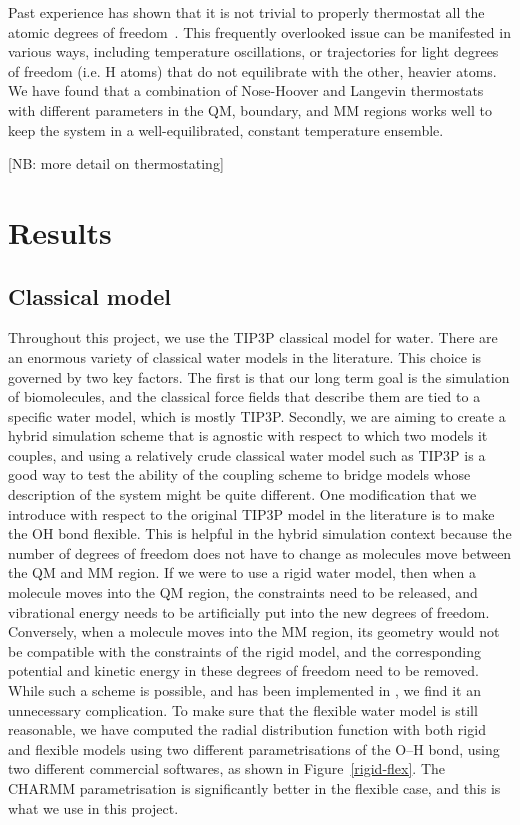 \documentclass[11pt]{revtex4}
\begin{document}
Past experience has shown that it is not trivial to properly
thermostat all the atomic degrees of freedom~\cite{winfield_thesis_2009a}.
This frequently overlooked issue can be manifested in various ways,
including temperature oscillations, or trajectories for light degrees
of freedom (i.e. H atoms) that do not equilibrate with the other,
heavier atoms.  We have found that a combination of Nose-Hoover and
Langevin thermostats with different parameters in the QM, boundary,
and MM regions works well to keep the system in a well-equilibrated,
constant temperature ensemble.

[NB: more detail on thermostating]

\section{Results}

\subsection{Classical model}

Throughout this project, we use the TIP3P classical model for water. There are an enormous variety of classical water models in the literature. This choice is governed by two key factors. The first is that our long term goal is the simulation of biomolecules, and the classical force fields that describe them are tied to a specific water model, which is mostly TIP3P. Secondly, we are aiming to create a hybrid simulation scheme that is agnostic with respect to which two models it couples, and using a relatively crude classical water model such as TIP3P is a good way to test the ability of the coupling scheme to bridge models whose description of the system might be quite different. One modification that we introduce with respect to the original TIP3P model in the literature is to make the OH bond flexible. This is helpful in the hybrid simulation context because the number of degrees of freedom does not have to change as molecules move between the QM and MM region. If we were to use a rigid water model, then when a molecule moves into the QM region, the constraints need to be released, and vibrational energy needs to be artificially put into the new degrees of freedom. Conversely, when a molecule moves into the MM region, its geometry would not be compatible with the constraints of the rigid model, and the corresponding potential and kinetic energy in these degrees of freedom need to be removed. While such a scheme is possible, and has been implemented in \cite{winfield_thesis_2009a}, we find it an unnecessary complication. To make sure that the flexible water model is still reasonable, we have computed the radial distribution function with both rigid and flexible models using two different parametrisations of the O--H bond, using two different commercial softwares, as shown in Figure~\ref{rigid-flex}. The CHARMM parametrisation is significantly better in the flexible case, and this is what we use in this project.
\end{document}
